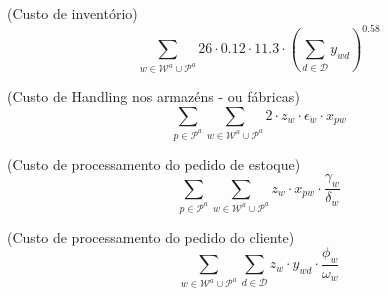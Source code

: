 \documentclass[12pt,a4paper]{article}
\begin{document}
\begin{center}
    (Custo de inventório)
    \begin{equation}
        \sum_{w \in \mathcal{W}^{a} \cup \mathcal{P}^{a}} 26 \cdot 0.12 \cdot 11.3 \cdot (\sum_{d \in \mathcal{D}} y_{wd})^{0.58}
    \end{equation}
\end{center}

\begin{center}
    (Custo de Handling nos armazéns - ou fábricas)
    \begin{equation}
        \sum_{p \in \mathcal{P}^{a}} \sum_{w \in \mathcal{W}^{a} \cup \mathcal{P}^{a}} 2 \cdot z_{w} \cdot \epsilon_{w} \cdot x_{pw}
    \end{equation}
\end{center}

\begin{center}
    (Custo de processamento do pedido de estoque)
    \begin{equation}
        \sum_{p \in \mathcal{P}^{a}} \sum_{w \in \mathcal{W}^{a} \cup \mathcal{P}^{a}} z_{w} \cdot x_{pw} \cdot \frac{\gamma_{w}}{\delta_{w}}
    \end{equation}
\end{center}

\begin{center}
    (Custo de processamento do pedido do cliente)
    \begin{equation}
        \sum_{w \in \mathcal{W}^{a} \cup \mathcal{P}^{a}} \sum_{d \in \mathcal{D}} z_{w} \cdot y_{wd} \cdot \frac{\phi_{w}}{\omega_{w}}
    \end{equation}
\end{center}
\end{document}
